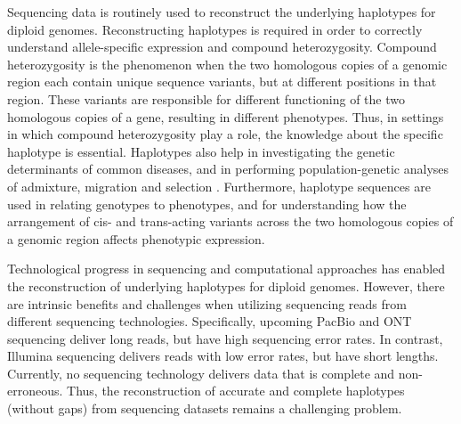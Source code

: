 
Sequencing data is routinely used to reconstruct the underlying haplotypes for diploid genomes. Reconstructing haplotypes is required in order to correctly understand allele-specific expression and compound heterozygosity. 
Compound heterozygosity is the phenomenon when the two homologous copies of a genomic region each contain unique sequence variants, 
but at different positions in that region. These variants are responsible for different functioning of the two homologous copies of a gene, resulting in different phenotypes.
Thus, in settings in which compound heterozygosity play a role, the knowledge about the specific haplotype is essential.
Haplotypes also help in investigating the genetic determinants of common diseases, and in performing population-genetic analyses of admixture, migration and selection \citep{tewhey2011importance, Glusman2014}. 
Furthermore, haplotype sequences are used in relating genotypes to phenotypes, and for understanding how the arrangement of cis- and trans-acting variants across the two homologous copies of a genomic region affects phenotypic expression.

Technological progress in sequencing and computational approaches has enabled the reconstruction of underlying haplotypes for diploid genomes.
However, there are intrinsic benefits and challenges when utilizing sequencing reads from different sequencing technologies. 
Specifically, upcoming PacBio and ONT sequencing deliver long reads, but have high sequencing error rates.
In contrast, Illumina sequencing delivers reads with low error rates, but have short lengths. Currently, no sequencing technology delivers data that is complete and non-erroneous.
Thus, the reconstruction of accurate and complete haplotypes (without gaps) from sequencing datasets remains a challenging problem.

